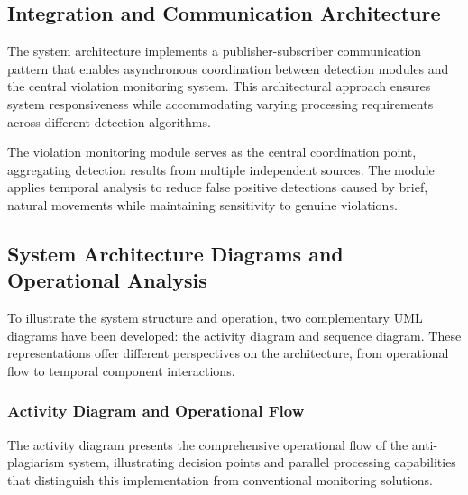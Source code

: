 \documentclass[conference]{IEEEtran}
\begin{document}
\subsection{Integration and Communication Architecture}

The system architecture implements a publisher-subscriber communication pattern that enables asynchronous coordination between detection modules and the central violation monitoring system. This architectural approach ensures system responsiveness while accommodating varying processing requirements across different detection algorithms.

The violation monitoring module serves as the central coordination point, aggregating detection results from multiple independent sources. The module applies temporal analysis to reduce false positive detections caused by brief, natural movements while maintaining sensitivity to genuine violations.

\subsection{System Architecture Diagrams and Operational Analysis}

To illustrate the system structure and operation, two complementary UML diagrams have been developed: the activity diagram and sequence diagram. These representations offer different perspectives on the architecture, from operational flow to temporal component interactions.

\subsubsection{Activity Diagram and Operational Flow}

The activity diagram presents the comprehensive operational flow of the anti-plagiarism system, illustrating decision points and parallel processing capabilities that distinguish this implementation from conventional monitoring solutions.
\end{document}
